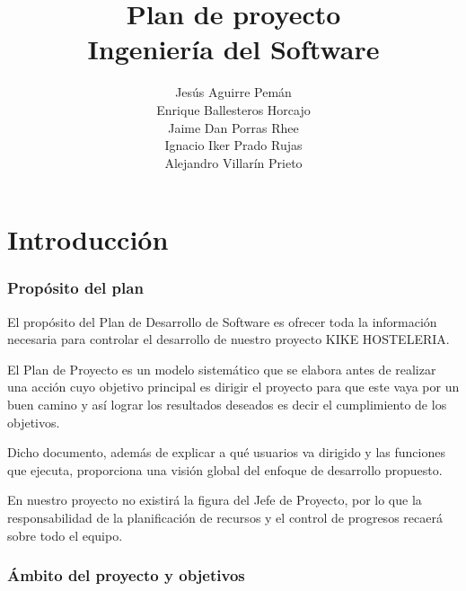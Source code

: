\documentclass[spanish,a4paper,12pt]{report}	%
\begin{document}
\title{\textbf{\huge{Plan de proyecto}} \\ \vspace{0.3cm}
	\Large{Ingeniería del Software}}
\author{ Jesús Aguirre Pemán \\
	 Enrique Ballesteros Horcajo \\
	 Jaime Dan Porras Rhee \\
	 Ignacio Iker Prado Rujas \\
	 Alejandro Villarín Prieto }
\date{\Today}
\maketitle

\newpage
\mbox{}
\thispagestyle{empty}						%
\newpage


\tableofcontents 							%

\newpage
\mbox{}
\thispagestyle{empty}						%
\newpage



\part{Introducción}

	\section{Propósito del plan}
El propósito del Plan de Desarrollo de Software es ofrecer toda la información necesaria para controlar el desarrollo de nuestro proyecto KIKE HOSTELERIA.

El Plan de Proyecto es un modelo sistemático que se elabora antes de realizar una acción cuyo objetivo principal es dirigir el proyecto para que este vaya por un buen camino y así lograr los resultados deseados es decir el cumplimiento de los objetivos. 

Dicho documento, además de explicar a qué usuarios va dirigido y las funciones que ejecuta, proporciona una visión global del enfoque de desarrollo propuesto.


En nuestro proyecto no existirá la figura del Jefe de Proyecto, por lo que la responsabilidad de la planificación de recursos y el control de progresos recaerá sobre todo el equipo.

	\section{Ámbito del proyecto y objetivos}
\end{document}
